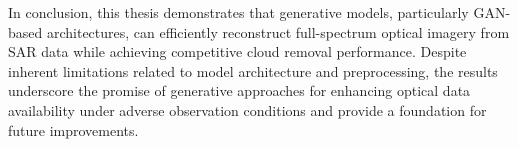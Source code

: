 In conclusion, this thesis demonstrates that generative models, particularly GAN-based architectures, can efficiently reconstruct full-spectrum optical imagery from SAR data while achieving competitive cloud removal performance. Despite inherent limitations related to model architecture and preprocessing, the results underscore the promise of generative approaches for enhancing optical data availability under adverse observation conditions and provide a foundation for future improvements.